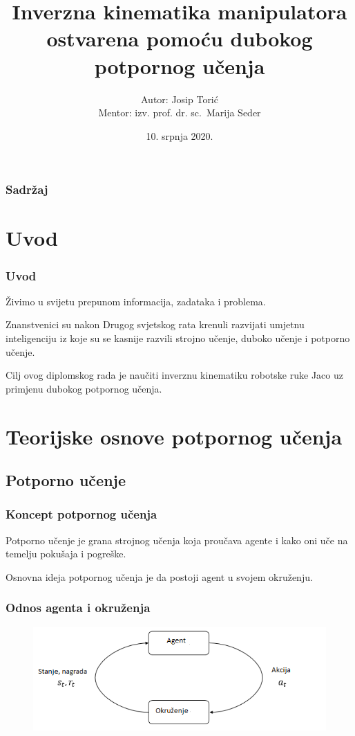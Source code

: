 \documentclass{beamer}
\title{Inverzna kinematika manipulatora ostvarena pomoću dubokog potpornog učenja }
\author{Autor: Josip Torić \\ Mentor: izv. prof. dr. sc.~Marija Seder}
\date{10. srpnja 2020.}
\institute{Fakultet elektrotehnike i računarstva, Sveučilište u Zagrebu}
\begin{document}
\frame{\titlepage}

\begin{frame}
	\frametitle{Sadržaj}
	\tableofcontents
\end{frame}

\section{Uvod}

\begin{frame}
	\frametitle{Uvod}

	Živimo u svijetu prepunom informacija, zadataka i problema.
	\bigskip

	Znanstvenici su nakon Drugog svjetskog rata krenuli razvijati umjetnu inteligenciju iz koje su se kasnije razvili strojno učenje, duboko učenje i potporno učenje.
	\bigskip

	Cilj ovog diplomskog rada je naučiti inverznu kinematiku robotske ruke Jaco uz primjenu dubokog potpornog učenja.

\end{frame}

\section{Teorijske osnove potpornog učenja}
\subsection{Potporno učenje}

\begin{frame}
	\frametitle{Koncept potpornog učenja}

	Potporno učenje je grana strojnog učenja koja proučava agente i kako oni uče na temelju pokušaja i pogreške.
	\bigskip

	Osnovna ideja potpornog učenja je da postoji agent u svojem okruženju.

\end{frame}


\begin{frame}
	\frametitle{Odnos agenta i okruženja}

	\begin{figure}[h!]
		\centering
		\includegraphics[width=\columnwidth]{img/agent-environment.png}
		\label{fig:agenta}
	\end{figure}


\end{frame}
\end{document}
